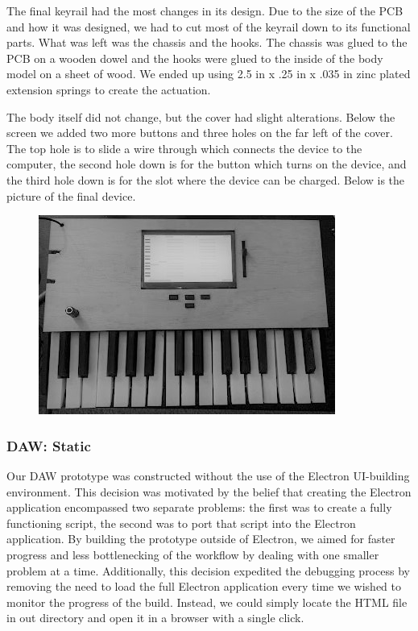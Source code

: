 The final keyrail had the most changes in its design. Due to the size of the PCB and how it was designed, we had to cut most of the keyrail down to its functional parts. What was left was the chassis and the hooks. The chassis was glued to the PCB on a wooden dowel and the hooks were glued to the inside of the body model on a sheet of wood. We ended up using 2.5 in x .25 in x .035 in zinc plated extension springs to create the actuation.

The body itself did not change, but the cover had slight alterations. Below the screen we added two more buttons and three holes on the far left of the cover. The top hole is to slide a wire through which connects the device to the computer, the second hole down is for the button which turns on the device, and the third hole down is for the slot where the device can be charged. Below is the picture of the final device.

\begin{figure}[h!]
  \centering
  \includegraphics[width=0.8\linewidth]{image/Keyboard_Photo.jpg}
  \caption{}
  \label{fig:keyboard_photo}
\end{figure}

\subsubsection{DAW: Static}

Our DAW prototype was constructed without the use of the Electron UI-building environment. This
decision was motivated by the belief that creating the Electron application encompassed two
separate problems: the first was to create a fully functioning script, the second was to port that
script into the Electron application. By building the prototype outside of Electron, we aimed for
faster progress and less bottlenecking of the workflow by dealing with one smaller problem at a
time. Additionally, this decision expedited the debugging process by removing the need to load
the full Electron application every time we wished to monitor the progress of the build. Instead,
we could simply locate the HTML file in out directory and open it in a browser with a single click.

